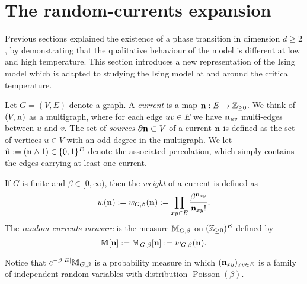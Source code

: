 \section{The random-currents expansion}

Previous sections explained the existence of a phase transition in dimension
$d\geq 2$, by demonstrating that the qualitative behaviour of the model 
is different at low and high temperature.
This section introduces a new representation of the Ising model
which is adapted to studying the Ising model at and around the critical temperature.

\begin{definition}[Currents]
    Let $G=(V,E)$ denote a graph.
    A \emph{current} is a map $\mathbf{n}:E\to\mathbb Z_{\geq 0}$.
    We think of $(V,\mathbf{n})$ as a multigraph,
    where for each edge $uv\in E$ we have $\mathbf{n}_{uv}$ multi-edges between $u$ and $v$.
    The set of \emph{sources} $\partial\mathbf{n}\subset V$ of a current
    $\mathbf{n}$ is defined as the set of vertices $u\in V$ with an odd degree in the multigraph.
    We let $\hat{\mathbf{n}}:=(\mathbf{n}\wedge 1)\in\{0,1\}^E$ denote the associated percolation,
    which simply contains the edges carrying at least one current.

    If $G$ is finite and $\beta\in[0,\infty)$, then the
    \emph{weight} of a current is defined as
    \[
        w(\mathbf{n}):=w_{G,\beta}(\mathbf{n}):=\prod_{xy\in E}
        \frac{\beta^{\mathbf{n}_{xy}}}{\mathbf{n}_{xy}!}.
    \]
    The \emph{random-currents measure} is the measure $\mathbb M_{G,\beta}$ on $(\mathbb Z_{\geq 0})^E$
    defined by
    \[
        \mathbb M[\mathbf{n}]:=\mathbb M_{G,\beta}[\mathbf{n}]:=w_{G,\beta}(\mathbf{n}).
    \]
\end{definition}

\begin{remark}
    Notice that $e^{-\beta|E|}\mathbb M_{G,\beta}$ is a probability measure
    in which $(\mathbf{n}_{xy})_{xy\in E}$ is a family of independent
    random variables with distribution $\operatorname{Poisson}(\beta)$.
\end{remark}

